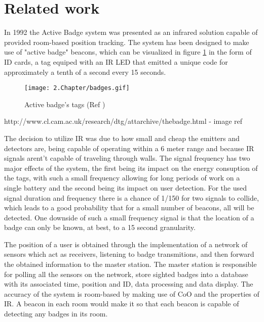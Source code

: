 \section{Related work}
\label{sec:related}



\label{subsec:badge}


In 1992 the Active Badge system \cite{badge} was presented as an infrared solution capable of provided room-based position tracking. The system has been designed to make use of "active badge" beacons, which can be visualized in figure \ref{fig:badge} in the form of ID cards, a tag equiped with an \ac{IR} LED that emitted a unique code for approximately a tenth of a second every 15 seconds.

\begin{figure}[H]
	\centering
		\texttt{[image: 2.Chapter/badges.gif]}
	\caption[Active badge's tags (Ref \cite{badgefig}) ]{Active badge's tags (Ref \cite{badgefig}) }
	\label{fig:badge}
\end{figure}

http://www.cl.cam.ac.uk/research/dtg/attarchive/thebadge.html - image ref

The decision to utilize \ac{IR} was due to how small and cheap the emitters and detectors are, being capable of operating within a 6 meter range and because \ac{IR} signals arent't capable of traveling through walls. The signal frequency has two major effects of the system, the first being its impact on the energy consuption of the tags, with such a small frequency allowing for long periods of work on a single battery and the second being its impact on user detection. For the used signal duration and frequency there is a chance of 1/150 for two signals to collide, which leads to a good probability that for a small number of beacons, all will be detected. One downside of such a small frequency signal is that the location of a badge can only be known, at best, to a 15 second granularity.

The position of a user is obtained through the implementation of a network of sensors which act as receivers, listening to badge transmitions, and then forward the obtained information to the master station. The master station is responsible for polling all the sensors on the network, store sighted badges into a database with its associated time, position and ID, data processing and data display. The accuracy of the system is room-based by making use of \ac{CoO} and the properties of \ac{IR}. A beacon in each room would make it so that each beacon is capable of detecting any badges in its room.

